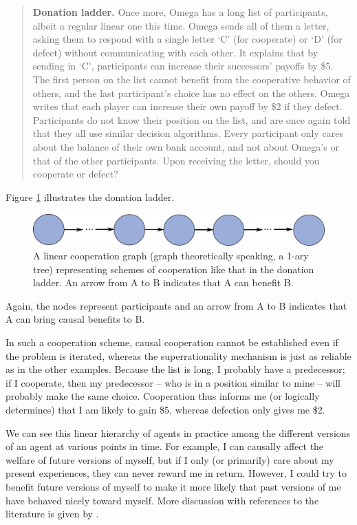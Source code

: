 \begin{quote}
\textbf{Donation ladder.} Once more, Omega has a long list of
participants, albeit a regular linear one this time. Omega sends all of
them a letter, asking them to respond with a single letter `C' (for
cooperate) or `D' (for defect) without communicating with each other. It
explains that by sending in `C', participants can increase their
successors' payoffs by \$5. The first person on the list cannot benefit
from the cooperative behavior of others, and the last participant's
choice has no effect on the others. Omega writes that each player can
increase their own payoff by \$2 if they defect. Participants do not
know their position on the list, and are once again told that they all
use similar decision algorithms. Every participant only cares about the
balance of their own bank account, and not about Omega's or that of the
other participants. Upon receiving the letter, should you cooperate or
defect?
\end{quote}

Figure \ref{donation-ladder} illustrates the donation
ladder.

\begin{figure}
    \centering
    \includegraphics[width=5.19271in,height=0.49167in]{figs/donation-ladder}
    \caption{A linear cooperation graph (graph theoretically
speaking, a 1-ary tree) representing schemes of cooperation like that in
the donation ladder. An arrow from A to B indicates that A can benefit
B.}
    \label{donation-ladder}
\end{figure}

Again, the nodes represent participants and an arrow from A to B
indicates that A can bring causal benefits to B.

In such a cooperation scheme, causal cooperation cannot be established
even if the problem is iterated, whereas the superrationality mechanism
is just as reliable as in the other examples. Because the list is long,
I probably have a predecessor; if I cooperate, then my predecessor --
who is in a position similar to mine -- will probably make the same
choice. Cooperation thus informs me (or logically determines) that I am
likely to gain \$5, whereas defection only gives me \$2.

We can see this linear hierarchy of agents in practice among the
different versions of an agent at various points in time. For example, I
can causally affect the welfare of future versions of myself, but if I
only (or primarily) care about my present experiences, they can never
reward me in return. However, I could try to benefit future versions of
myself to make it more likely that past versions of me have behaved
nicely toward myself. More discussion with references to the literature
is given by \citet[section 7.3.4]{Drescher2006-ky}.

